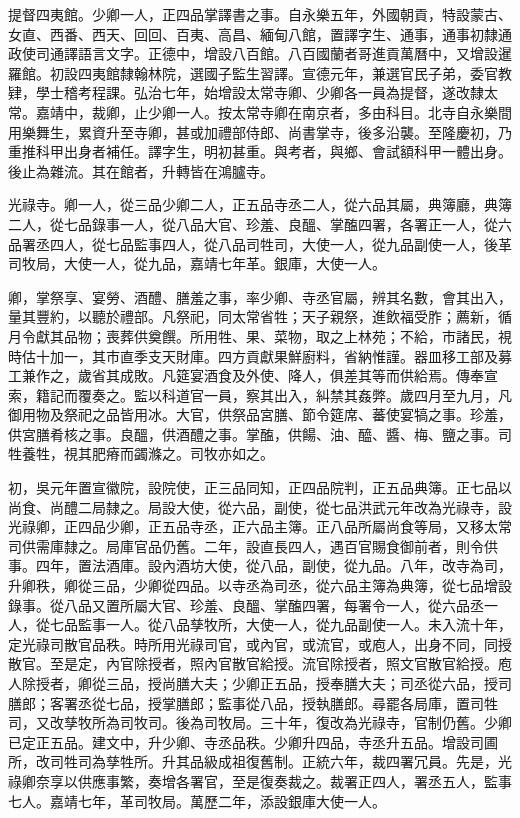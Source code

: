 提督四夷館。少卿一人，正四品掌譯書之事。自永樂五年，外國朝貢，特設蒙古、女直、西番、西天、回回、百夷、高昌、緬甸八館，置譯字生、通事，通事初隸通政使司通譯語言文字。正德中，增設八百館。八百國蘭者哥進貢萬曆中，又增設暹羅館。初設四夷館隸翰林院，選國子監生習譯。宣德元年，兼選官民子弟，委官教肄，學士稽考程課。弘治七年，始增設太常寺卿、少卿各一員為提督，遂改隸太常。嘉靖中，裁卿，止少卿一人。按太常寺卿在南京者，多由科目。北寺自永樂間用樂舞生，累資升至寺卿，甚或加禮部侍郎、尚書掌寺，後多沿襲。至隆慶初，乃重推科甲出身者補任。譯字生，明初甚重。與考者，與鄉、會試額科甲一體出身。後止為雜流。其在館者，升轉皆在鴻臚寺。

光祿寺。卿一人，從三品少卿二人，正五品寺丞二人，從六品其屬，典簿廳，典簿二人，從七品錄事一人，從八品大官、珍羞、良醞、掌醢四署，各署正一人，從六品署丞四人，從七品監事四人，從八品司牲司，大使一人，從九品副使一人，後革司牧局，大使一人，從九品，嘉靖七年革。銀庫，大使一人。

卿，掌祭享、宴勞、酒醴、膳羞之事，率少卿、寺丞官屬，辨其名數，會其出入，量其豐約，以聽於禮部。凡祭祀，同太常省牲；天子親祭，進飲福受胙；薦新，循月令獻其品物；喪葬供奠饌。所用牲、果、菜物，取之上林苑；不給，市諸民，視時估十加一，其市直季支天財庫。四方貢獻果鮮廚料，省納惟謹。器皿移工部及募工兼作之，歲省其成敗。凡筵宴酒食及外使、降人，俱差其等而供給焉。傳奉宣索，籍記而覆奏之。監以科道官一員，察其出入，糾禁其姦弊。歲四月至九月，凡御用物及祭祀之品皆用冰。大官，供祭品宮膳、節令筵席、蕃使宴犒之事。珍羞，供宮膳肴核之事。良醞，供酒醴之事。掌醢，供餳、油、醯、醬、梅、鹽之事。司牲養牲，視其肥瘠而蠲滌之。司牧亦如之。

初，吳元年置宣徽院，設院使，正三品同知，正四品院判，正五品典簿。正七品以尚食、尚醴二局隸之。局設大使，從六品，副使，從七品洪武元年改為光祿寺，設光祿卿，正四品少卿，正五品寺丞，正六品主簿。正八品所屬尚食等局，又移太常司供需庫隸之。局庫官品仍舊。二年，設直長四人，遇百官賜食御前者，則令供事。四年，置法酒庫。設內酒坊大使，從八品，副使，從九品。八年，改寺為司，升卿秩，卿從三品，少卿從四品。以寺丞為司丞，從六品主簿為典簿，從七品增設錄事。從八品又置所屬大官、珍羞、良醞、掌醢四署，每署令一人，從六品丞一人，從七品監事一人。從八品孳牧所，大使一人，從九品副使一人。未入流十年，定光祿司散官品秩。時所用光祿司官，或內官，或流官，或庖人，出身不同，同授散官。至是定，內官除授者，照內官散官給授。流官除授者，照文官散官給授。庖人除授者，卿從三品，授尚膳大夫；少卿正五品，授奉膳大夫；司丞從六品，授司膳郎；客署丞從七品，授掌膳郎；監事從八品，授執膳郎。尋罷各局庫，置司牲司，又改孳牧所為司牧司。後為司牧局。三十年，復改為光祿寺，官制仍舊。少卿已定正五品。建文中，升少卿、寺丞品秩。少卿升四品，寺丞升五品。增設司圃所，改司牲司為孳牲所。升其品級成祖復舊制。正統六年，裁四署冗員。先是，光祿卿奈享以供應事繁，奏增各署官，至是復奏裁之。裁署正四人，署丞五人，監事七人。嘉靖七年，革司牧局。萬歷二年，添設銀庫大使一人。

